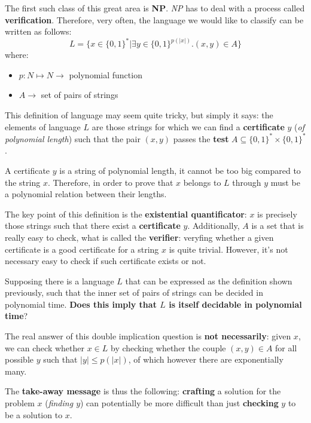 The first such class of this great area is \textbf{NP}. \textit{NP} has to deal with a process called \textbf{verification}. Therefore, very often, the language
we would like to classify can be written as follows:
$$ L = \{x \in \{0,1\}^* | \exists y \in \{0,1\}^{p(|x|)}.(x,y) \in A\} $$
where:
\begin{itemize}
    \renewcommand{\labelitemi}{-}
    \item $p: N \mapsto N \rightarrow$ polynomial function
    \item $A \rightarrow$ set of pairs of strings
\end{itemize}
This definition of language may seem quite tricky, but simply it says: the elements of language $L$ are those strings for which we can find a \textbf{certificate}
$y$ (\textit{of polynomial length}) such that the pair $(x, y)$ passes the \textbf{test} $A \subseteq \{0,1\}^* \times \{0,1\}^*$. \vspace{7pt}

A certificate $y$ is a string of polynomial length, it cannot be too big compared to the string $x$. Therefore, in order to prove that $x$ belongs to $L$
through $y$ must be a polynomial relation between their lengths.

The key point of this definition is the \textbf{existential quantificator}: $x$ is precisely those strings such that there exist a \textbf{certificate} $y$. 
Additionally, $A$ is a set that is really easy to check, what is called the \textbf{verifier}: veryfing whether a given certificate is a good certificate 
for a string $x$ is quite trivial. However, it's not necessary easy to check if such certificate exists or not. \vspace{7pt}

Supposing there is a language $L$ that can be expressed as the definition shown previously, such that the inner set of pairs of strings can be decided 
in polynomial time. \textbf{Does this imply that $L$ is itself decidable in polynomial time}? 

The real answer of this double implication question is \textbf{not necessarily}: given $x$, we can check whether $x \in L$ by checking whether the couple 
$(x, y) \in A$ for all possible $y$ such that $|y| \leq p(|x|)$, of which however there are exponentially many. \vspace{7pt}

The \textbf{take-away message} is thus the following: \textbf{crafting} a solution for the problem $x$ (\textit{finding $y$}) can potentially be more difficult
than just \textbf{checking} $y$ to be a solution to $x$.